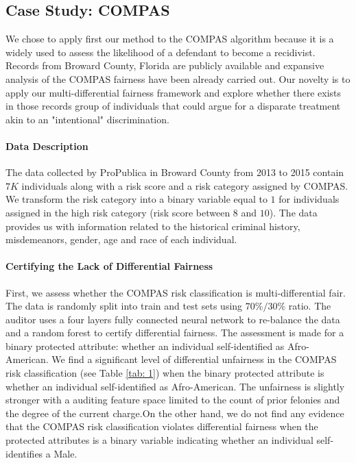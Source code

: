 \documentclass{article}
\begin{document}
\subsection{Case Study: COMPAS}
We chose to apply first our method to the COMPAS algorithm because it is a
 widely used to assess the likelihood of a defendant to become a recidivist. Records from Broward County, Florida are publicly available and expansive analysis of the COMPAS fairness have been already carried out. Our novelty is to apply our multi-differential fairness framework and explore whether there exists in those records group of individuals that could argue for a disparate treatment akin to an "intentional" discrimination. 

\paragraph{Data Description}
The data collected by ProPublica in Broward County from 2013 to 2015  contain $7K$ individuals along with a risk score and a risk category assigned by COMPAS. We transform the risk category into a binary variable equal to $1$ for individuals assigned in the high risk category (risk score between $8$ and $10$). The data provides us with information related to the historical criminal history, misdemeanors, gender, age and race of each individual.   

 \paragraph{Certifying the Lack of Differential Fairness}
First, we assess whether the COMPAS risk classification is multi-differential fair. The data is randomly split into train and test sets using $70\%/30\%$ ratio. The auditor uses a four layers fully connected neural network to re-balance the data and a random forest to certify differential fairness. The assessment is made for a binary protected attribute:  whether an individual self-identified as Afro-American.  We find a significant level of differential unfairness in the COMPAS risk classification (see Table \ref{tab: 1}) when the binary protected attribute is whether an individual self-identified as Afro-American. The unfairness is slightly stronger with a auditing feature space limited to the count of prior felonies and the degree of the current charge.On the other hand, we do not find any evidence that the COMPAS risk classification violates differential fairness when the protected attributes is a binary variable indicating whether an individual self-identifies a Male.
\end{document}
